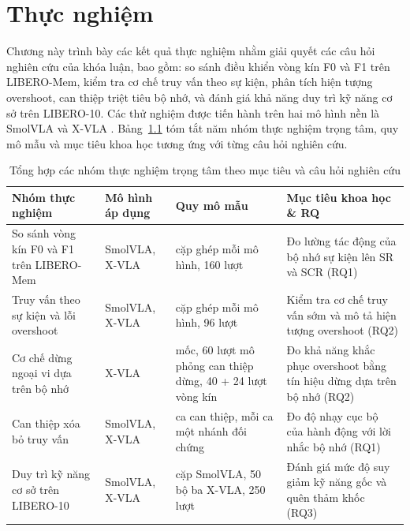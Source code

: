 \chapter{Thực nghiệm}

Chương này trình bày các kết quả thực nghiệm nhằm giải quyết các câu hỏi nghiên cứu của khóa luận, bao gồm: so sánh điều khiển vòng kín F0 và F1 trên LIBERO-Mem, kiểm tra cơ chế truy vấn theo sự kiện, phân tích hiện tượng overshoot, can thiệp triệt tiêu bộ nhớ, và đánh giá khả năng duy trì kỹ năng cơ sở trên LIBERO-10. Các thử nghiệm được tiến hành trên hai mô hình nền là SmolVLA \cite{smolvla2025} và X-VLA \cite{xvla2025}. Bảng~\ref{tab:experiment-rq-map} tóm tắt năm nhóm thực nghiệm trọng tâm, quy mô mẫu và mục tiêu khoa học tương ứng với từng câu hỏi nghiên cứu.

\begin{table}[htbp]
\centering\small
\caption{Tổng hợp các nhóm thực nghiệm trọng tâm theo mục tiêu và câu hỏi nghiên cứu}
\label{tab:experiment-rq-map}
\setlength{\tabcolsep}{4pt}
\begin{tabular}{>{\raggedright\arraybackslash}p{}|>{\raggedright\arraybackslash}p{}|>{\raggedright\arraybackslash}p{}|>{\raggedright\arraybackslash}p{}}
\toprule
\textbf{Nhóm thực nghiệm} & \textbf{Mô hình áp dụng} & \textbf{Quy mô mẫu} & \textbf{Mục tiêu khoa học \& RQ} \\
\midrule
So sánh vòng kín F0 và F1 trên LIBERO-Mem & SmolVLA, X-VLA & 40 cặp ghép mỗi mô hình, 160 lượt & Đo lường tác động của bộ nhớ sự kiện lên SR và SCR (RQ1) \\
\midrule
Truy vấn theo sự kiện và lỗi overshoot & SmolVLA, X-VLA & 24 cặp ghép mỗi mô hình, 96 lượt & Kiểm tra cơ chế truy vấn sớm và mô tả hiện tượng overshoot (RQ2) \\
\midrule
Cơ chế dừng ngoại vi dựa trên bộ nhớ & X-VLA & 35 mốc, 60 lượt mô phỏng can thiệp dừng, 40 + 24 lượt vòng kín & Đo khả năng khắc phục overshoot bằng tín hiệu dừng dựa trên bộ nhớ (RQ2) \\
\midrule
Can thiệp xóa bỏ truy vấn & SmolVLA, X-VLA & 3 ca can thiệp, mỗi ca một nhánh đối chứng & Đo độ nhạy cục bộ của hành động với lời nhắc bộ nhớ (RQ1) \\
\midrule
Duy trì kỹ năng cơ sở trên LIBERO-10 & SmolVLA, X-VLA & 50 cặp SmolVLA, 50 bộ ba X-VLA, 250 lượt & Đánh giá mức độ suy giảm kỹ năng gốc và quên thảm khốc (RQ3) \\
\bottomrule
\end{tabular}
\end{table}

